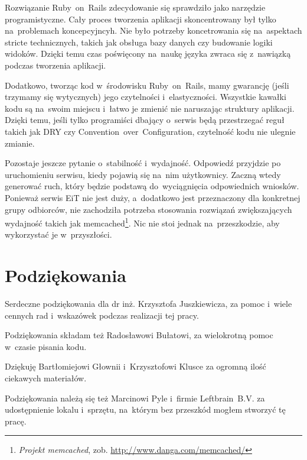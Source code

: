 \documentclass[a4paper,12pt,oneside]{report}
\begin{document}
Rozwiązanie Ruby~on~Rails zdecydowanie się sprawdziło jako narzędzie programistyczne. Cały proces tworzenia aplikacji skoncentrowany był tylko na~problemach koncepcyjncyh. Nie było potrzeby koncetrowania się na~aspektach stricte technicznych, takich jak obsługa bazy danych czy budowanie logiki widoków. Dzięki temu czas poświęcony na~naukę języka zwraca się z~nawiązką podczas tworzenia aplikacji.

Dodatkowo, tworząc kod w~środowisku Ruby~on~Rails, mamy gwarancję (jeśli trzymamy się wytycznych) jego czytelności i~elastyczności. Wszystkie kawałki kodu są na~swoim miejscu i~łatwo je zmienić nie naruszając struktury aplikacji. Dzięki temu, jeśli tylko programiści dbający o~serwis będą przestrzegać reguł takich jak DRY czy Convention~over~Configuration, czytelność kodu nie ulegnie zmianie.

Pozostaje jeszcze pytanie o~stabilność i~wydajność. Odpowiedź przyjdzie po uruchomieniu serwisu, kiedy pojawią się na~nim użytkownicy. Zaczną wtedy generować ruch, który będzie podstawą do~wyciągnięcia odpowiednich wniosków. Ponieważ serwis EiT nie jest duży, a~dodatkowo jest przeznaczony dla konkretnej grupy odbiorców, nie zachodziła potrzeba stosowania rozwiązań zwiększających wydajność takich jak memcached\footnote{\emph{Projekt memcached}, zob. \url{http://www.danga.com/memcached/}}. Nic nie stoi jednak na~przeszkodzie, aby wykorzystać je w~przyszłości.

\chapter*{Podziękowania}
Serdeczne podziękowania dla dr inż. Krzysztofa Juszkiewicza, za pomoc i~wiele cennych rad i~wskazówek podczas realizacji tej pracy.

Podziękowania składam też Radosławowi Bułatowi, za wielokrotną pomoc w~czasie pisania kodu.

Dziękuję Bartłomiejowi Głownii i~Krzysztofowi Klusce za ogromną ilość ciekawych materiałów.

Podziękowania należą się też Marcinowi Pyle i~firmie Leftbrain~B.V. za udostępnienie lokalu i~sprzętu, na~którym bez przeszkód mogłem stworzyć tę pracę.
\nocite{*}


\end{document}
